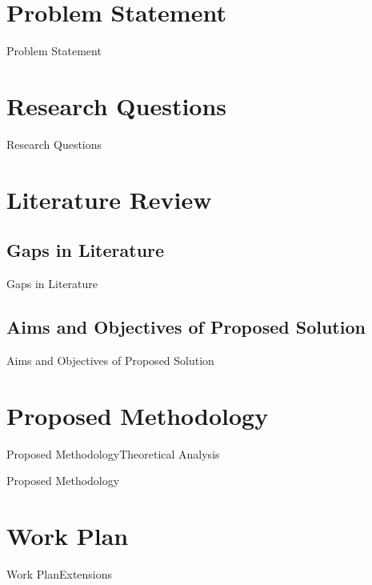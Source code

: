 \documentclass[xcolor=dvipsnames, compress]{beamer}
\begin{document}
\section{Problem Statement}
\begin{frame}{Problem Statement}

\end{frame}

\section{Research Questions}
\begin{frame}{Research Questions}

\end{frame}

\section{Literature Review}
\subsection{Gaps in Literature}


\begin{frame}{Gaps in Literature}


\end{frame}


\subsection{Aims and Objectives of Proposed Solution}

\begin{frame}{Aims and Objectives of Proposed Solution}

\end{frame}


\section{Proposed Methodology}
\begin{frame}{Proposed Methodology}{Theoretical Analysis}
\end{frame}


\begin{frame}{Proposed Methodology}

\end{frame}

\section{Work Plan}
\begin{frame}{Work Plan}{Extensions}

\end{frame}
\end{document}
